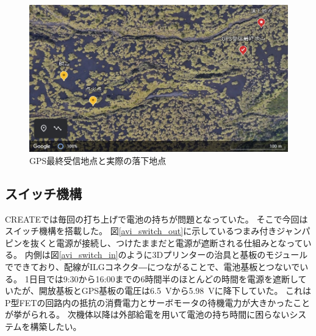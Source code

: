 \documentclass[a4paper,11pt,uplatex]{jsarticle}
\begin{document}
\begin{figure}[H]
	\centering
	\includegraphics[width=0.8\linewidth]{pic_avi/GPS_data.jpg}
	\caption{GPS最終受信地点と実際の落下地点}
	\label{fig:GPS_data}
\end{figure}

\subsection{スイッチ機構}
\label{switch}
CREATEでは毎回の打ち上げで電池の持ちが問題となっていた。
そこで今回はスイッチ機構を搭載した。
図\ref{avi_switch_out}に示しているつまみ付きジャンパピンを抜くと電源が接続し、つけたままだと電源が遮断される仕組みとなっている。
内側は図\ref{avi_switch_in}のように3Dプリンターの治具と基板のモジュールでできており、配線がILGコネクタ―につながることで、電池基板とつないでいる。
1日目では9:30から16:00までの6時間半のほとんどの時間を電源を遮断していたが、開放基板とGPS基板の電圧は\SI{6.5}{V}から\SI{5.98}{V}に降下していた。
これはP型FETの回路内の抵抗の消費電力とサーボモータの待機電力が大きかったことが挙がられる。
次機体以降は外部給電を用いて電池の持ち時間に困らないシステムを構築したい。
\end{document}
